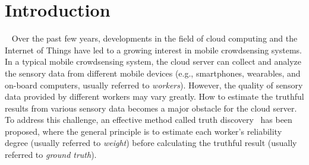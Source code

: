 \documentclass[conference]{IEEEtran}
\begin{document}
\section{Introduction}~\label{sec1}
Over the past few years, developments in the field of cloud computing and the Internet of Things have led to a growing interest in mobile crowdsensing systems.
In a typical mobile crowdsensing system, the cloud server can collect and analyze the sensory data from different mobile devices (e.g., smartphones, wearables, and on-board computers, usually referred to {\em workers}).
However, the quality of sensory data provided by different workers may vary greatly.
How to estimate the truthful results from various sensory data becomes a major obstacle for the cloud server.
To address this challenge, an effective method called truth discovery~\cite{li_resolving_2014,li_confidence-aware_2014,li_conflicts_2016} has been proposed, where the general principle is to estimate each worker's reliability degree (usually referred to {\em weight}) before calculating the truthful result (usually referred to {\em ground truth}).
\end{document}
